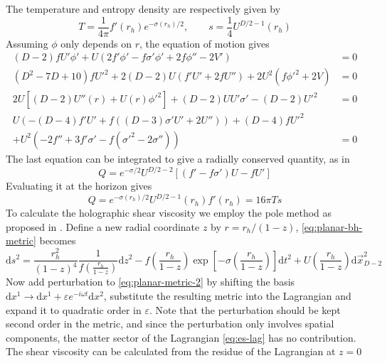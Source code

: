 \documentclass[a4paper,11pt]{article}
\newcommand{\dd}{{\mathrm d}}
\begin{document}
The temperature and entropy density are respectively given by
\begin{equation}
    T = \frac{1}{4\pi}f'(r_h)e^{-\sigma(r_h)/2},
    \qquad s = \frac14 U^{D / 2 - 1}(r_h)
\end{equation}
Assuming $\phi$ only depends on $r$, the equation of motion gives
\begin{align}\label{eq:es-eoms}
    (D-2) f U' \phi' + U \left(2 f' \phi' - f \sigma' \phi' + 2f \phi'' - 2 V'\right) & = 0\nonumber\\
    \left(D^2-7 D + 10\right) f U'^2 + 2 (D - 2) U \left(f' U' + 2f U''\right) + 2 U^2 \left(f \phi'^2 + 2 V\right) & = 0\nonumber\\
    2 U \left[(D - 2) U''(r)+U(r) \phi'^2\right] + (D - 2) U U' \sigma' - (D - 2) U'^2 & = 0\nonumber\\
    U\left(-(D-4) f' U' + f\left((D - 3) \sigma' U' + 2 U''\right)\right)+(D - 4) f U'^2 &\nonumber\\
    + U^2 \left(-2 f''+3 f' \sigma ' - f \left(\sigma'^2 - 2\sigma''\right)\right) & = 0
\end{align}
The last equation can be integrated to give a radially conserved quantity, as in \cite{hairy-thermodynamics}
\begin{equation}\label{eq:conserved-q}
    Q = e^{-\sigma / 2} U^{D/2 - 2} \left[\left(f' - f\sigma'\right)U - f U'\right]
\end{equation}
Evaluating it at the horizon gives
\begin{equation}
    Q = e^{-\sigma(r_h) / 2}U^{D/2 - 1}(r_h)f'(r_h) = 16\pi T s
\end{equation}
To calculate the holographic shear viscosity we employ the pole method as proposed in \cite{pole-method}. Define a new radial coordinate $z$ by $r = r_h / (1 - z)$, \eqref{eq:planar-bh-metric} becomes
\begin{equation}\label{eq:planar-metric-2}
    \dd s^2 = \frac{r_h^2}{(1 - z)^4} \frac{1}{f(\frac{r_h}{1 - z})} \dd z^2 - f\left(\frac{r_h}{1 - z}\right)\exp\left[-\sigma\left(\frac{r_h}{1 - z}\right)\right] \dd t^2 + U\left(\frac{r_h}{1 - z}\right) \dd\vec x_{D - 2}^2
\end{equation}
Now add perturbation to \eqref{eq:planar-metric-2} by shifting the basis $\dd x^1 \to \dd x^1 + \varepsilon e^{-i\omega t}\dd x^2$, substitute the resulting metric into the Lagrangian and expand it to quadratic order in $\varepsilon$. Note that the perturbation should be kept second order in the metric, and since the perturbation only involves spatial components, the matter sector of the Lagrangian \eqref{eq:es-lag} has no contribution. The shear viscosity can be calculated from the residue of the Lagrangian at $z = 0$
\end{document}
